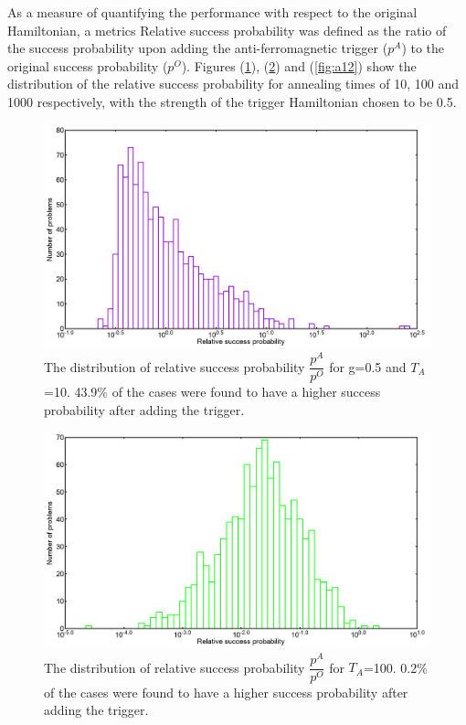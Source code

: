 \documentclass[../main.tex]{subfiles}
\begin{document}
As a measure of quantifying the performance with respect to the original Hamiltonian, a metrics Relative success probability was defined as the ratio of the success probability upon adding the anti-ferromagnetic trigger ($p^A$) to the original success probability ($p^O$). Figures (\ref{fig:a10}), (\ref{fig:a11}) and (\ref{fig:a12}) show the  distribution of the relative success probability for annealing times of 10, 100 and 1000 respectively, with the strength of the trigger Hamiltonian chosen to be 0.5.

\begin{figure}[H]
\centering 
\includegraphics[scale=0.3]{A_T10_g0.png}
\caption{The distribution of relative success probability $\dfrac{p^A}{p^O}$ for g=0.5 and $T_A$=10. 43.9\% of the cases were found to have a higher success probability after adding the trigger.}
\label{fig:a10}
\end{figure}
\begin{figure}[H]
\centering 
\includegraphics[scale=0.3]{A_T100_g0.png}
\caption{The distribution of relative success probability $\dfrac{p^A}{p^O}$ for $T_A$=100. 0.2\% of the cases were found to have a higher success probability after adding the trigger. }
\label{fig:a11}
\end{figure}
\end{document}
